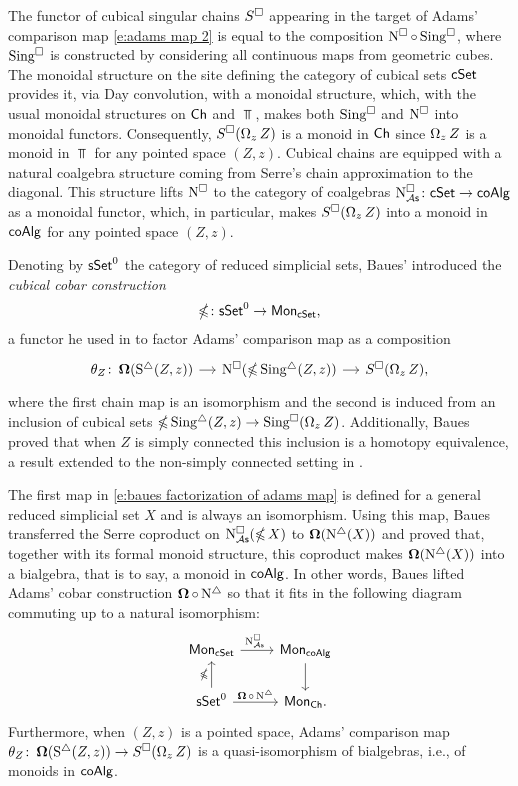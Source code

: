 The functor of cubical singular chains $S^\square$ appearing in the target of Adams' comparison map \eqref{e:adams map 2} is equal to the composition $\operatorname{N^{\square}} \circ \operatorname{Sing^{\square}}$, where $\operatorname{Sing^{\square}}$ is constructed by considering all continuous maps from geometric cubes.
The monoidal structure on the site defining the category of cubical sets $\mathsf{cSet}$ provides it, via Day convolution, with a monoidal structure, which, with the usual monoidal structures on $\mathsf{Ch}$ and $\Top$, makes both $\operatorname{Sing^{\square}}$ and $\operatorname{N^{\square}}$ into monoidal functors.
Consequently, $S^\square(\operatorname{\Omega}_z Z)$ is a monoid in $\mathsf{Ch}$ since $\operatorname{\Omega}_z Z$ is a monoid in $\Top$ for any pointed space $(Z, z)$.
Cubical chains are equipped with a natural coalgebra structure coming from Serre's chain approximation to the diagonal.
This structure lifts $\operatorname{N^{\square}}$ to the category of coalgebras $\operatorname{N^{\square}_{{\mathcal{A}\mathsf{s}}}} \colon \mathsf{cSet} \to \mathsf{coAlg}$ as a monoidal functor, which, in particular, makes $S^\square(\operatorname{\Omega}_z Z)$ into a monoid in $\mathsf{coAlg}$ for any pointed space $(Z, z)$.

Denoting by $\mathsf{sSet}^0$ the category of reduced simplicial sets, Baues' introduced the \textit{cubical cobar construction}
\begin{equation*}
\operatorname{\mathbb{\Omega}} \colon \mathsf{sSet}^0 \to \mathsf{Mon}_{\mathsf{cSet}},
\end{equation*}
a functor he used in \cite{baues1998hopf} to factor Adams' comparison map as a composition
\begin{equation} \label{e:baues factorization of adams map}
\begin{tikzcd}[column sep = small]
\theta_Z \colon \cobar(\sS(Z, z)) \arrow[r] &
\cchains(\ccobar \sSing(Z, z)) \arrow[r] &
S^{\cube}(\loops_z Z),
\end{tikzcd}
\end{equation}
where the first chain map is an isomorphism and the second is induced from an inclusion of cubical sets $\operatorname{\mathbb{\Omega}} \operatorname{Sing^{\triangle}}(Z, z) \to \operatorname{Sing^{\square}}(\operatorname{\Omega}_z Z)$.
Additionally, Baues proved that when $Z$ is simply connected this inclusion is a homotopy equivalence, a result extended to the non-simply connected setting in \cite{rivera2019path}.

The first map in \eqref{e:baues factorization of adams map} is defined for a general reduced simplicial set $X$ and is always an isomorphism.
Using this map, Baues transferred the Serre coproduct on $\operatorname{N^{\square}_{{\mathcal{A}\mathsf{s}}}}(\operatorname{\mathbb{\Omega}} X)$ to $\operatorname{\mathbf{\Omega}}(\operatorname{N^{\triangle}}(X))$ and proved that, together with its formal monoid structure, this coproduct makes $\operatorname{\mathbf{\Omega}}(\operatorname{N^{\triangle}}(X))$ into a bialgebra, that is to say, a monoid in $\mathsf{coAlg}$.
In other words, Baues lifted Adams' cobar construction $\operatorname{\mathbf{\Omega}} \circ \operatorname{N^{\triangle}}$ so that it fits in the following diagram commuting up to a natural isomorphism:
\begin{equation*}
\begin{tikzcd}
\Mon_{\cSet} \arrow[r, "\cchainsAS \ "] & \Mon_{\coAlg} \arrow[d] \\
\sSet^0 \arrow[r, "\cobar \circ \schains"] \arrow[u, "\ccobar"] & \Mon_{\Ch}.
\end{tikzcd}
\end{equation*}
Furthermore, when $(Z, z)$ is a pointed space, Adams' comparison map $\theta_Z \colon \operatorname{\mathbf{\Omega}}(\operatorname{S^{\triangle}}(Z, z)) \to S^{\square}(\operatorname{\Omega}_z Z)$ is a quasi-isomorphism of bialgebras, i.e., of monoids in $\mathsf{coAlg}$.

